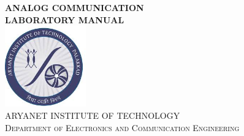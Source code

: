 \begin{titlepage}
\begin{center}
\Large{{\textbf{ANALOG COMMUNICATION\\ LABORATORY MANUAL}}}\\[2cm]
\includegraphics[height=3.5cm,width=3.5cm]{AITlogo.jpg}\\[3cm]
\textsc{\Large {ARYANET INSTITUTE OF TECHNOLOGY}}~\\[.5cm]
{\textsc{\Large {Department of Electronics and Communication Engineering}}}\\
\end{center}
\end{titlepage}
